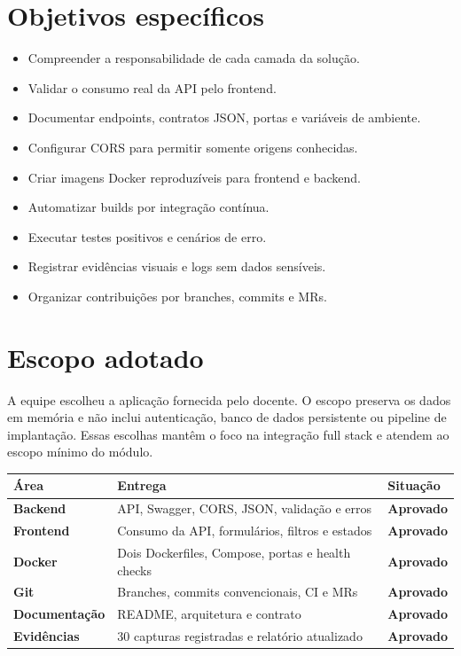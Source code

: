 \documentclass[12pt,a4paper,openany]{report}
\newcommand{\statusok}{\textcolor{OrbitGreen}{\textbf{Aprovado}}}
\begin{document}
\section{Objetivos específicos}

\begin{itemize}
  \item Compreender a responsabilidade de cada camada da solução.
  \item Validar o consumo real da API pelo frontend.
  \item Documentar endpoints, contratos JSON, portas e variáveis de ambiente.
  \item Configurar CORS para permitir somente origens conhecidas.
  \item Criar imagens Docker reproduzíveis para frontend e backend.
  \item Automatizar builds por integração contínua.
  \item Executar testes positivos e cenários de erro.
  \item Registrar evidências visuais e logs sem dados sensíveis.
  \item Organizar contribuições por branches, commits e MRs.
\end{itemize}

\section{Escopo adotado}

A equipe escolheu a aplicação fornecida pelo docente. O escopo preserva os dados em memória e não inclui autenticação, banco de dados persistente ou pipeline de implantação. Essas escolhas mantêm o foco na integração full stack e atendem ao escopo mínimo do módulo.

\begin{statusbox}
\begin{tabularx}{\textwidth}{>{\bfseries}p{} X p{}}
\toprule
Área & Entrega & Situação \\
\midrule
Backend & API, Swagger, CORS, JSON, validação e erros & \statusok \\
Frontend & Consumo da API, formulários, filtros e estados & \statusok \\
Docker & Dois Dockerfiles, Compose, portas e health checks & \statusok \\
Git & Branches, commits convencionais, CI e MRs & \statusok \\
Documentação & README, arquitetura e contrato & \statusok \\
Evidências & 30 capturas registradas e relatório atualizado & \statusok \\
\bottomrule
\end{tabularx}
\end{statusbox}
\end{document}

